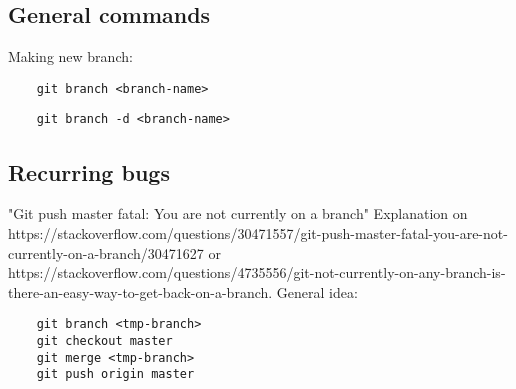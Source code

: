\documentclass{article}
\begin{document}
\subsection{General commands}
Making new branch:
\begin{verbatim}
    git branch <branch-name>
\end{verbatim}

\begin{verbatim}
    git branch -d <branch-name>
\end{verbatim}

\subsection{Recurring bugs}

"Git push master fatal: You are not currently on a branch"
Explanation on https://stackoverflow.com/questions/30471557/git-push-master-fatal-you-are-not-currently-on-a-branch/30471627 or https://stackoverflow.com/questions/4735556/git-not-currently-on-any-branch-is-there-an-easy-way-to-get-back-on-a-branch.
General idea:
\begin{verbatim}
    git branch <tmp-branch>
	git checkout master
	git merge <tmp-branch>
	git push origin master
\end{verbatim}
\end{document}
